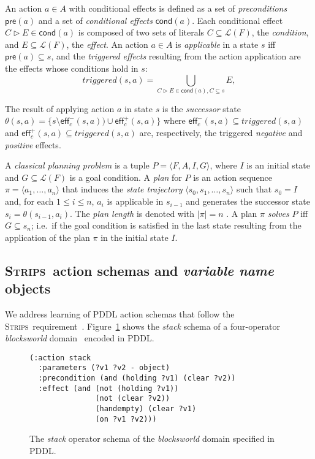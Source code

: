 \documentclass[letterpaper]{article} %
\newcommand{\tup}[1]{{\langle #1 \rangle}}
\newcommand{\pre}{\mathsf{pre}}     %
\newcommand{\eff}{\mathsf{eff}}     %
\newcommand{\cond}{\mathsf{cond}}   %
\newcommand{\strips}{\textsc{Strips}}     %
\begin{document}
An action $a\in A$ with conditional effects is defined as a set of {\em preconditions} $\pre(a)$ and a set of {\em conditional effects} $\cond(a)$. Each conditional effect $C\rhd E\in\cond(a)$ is composed of two sets of literals $C \subseteq \mathcal{L}(F)$, the {\em condition}, and $E \subseteq \mathcal{L}(F)$, the {\em effect}. An action $a\in A$ is {\em applicable} in a state $s$ iff $\pre(a)\subseteq s$, and the {\em triggered effects} resulting from the action application are the effects whose conditions hold in $s$:
\[
triggered(s,a)=\bigcup_{C\rhd E\in\cond(a),C\subseteq s} E,
\]

The result of applying action $a$ in state $s$ is the {\em successor} state $\theta(s,a)=\{s\setminus\eff_c^-(s,a))\cup\eff_c^+(s,a)\}$ where $\eff_c^-(s,a)\subseteq triggered(s,a)$ and $\eff_c^+(s,a)\subseteq triggered(s,a)$ are, respectively, the triggered {\em negative} and {\em positive} effects.


A {\em classical planning problem} is a tuple $P=\tup{F,A,I,G}$, where $I$ is an initial state and $G\subseteq\mathcal{L}(F)$ is a goal condition. A {\em plan} for $P$ is an action sequence $\pi=\tup{a_1, \ldots, a_n}$ that induces the {\em state trajectory} $\tup{s_0, s_1, \ldots, s_n}$ such that $s_0=I$ and, for each {\small $1\leq i\leq n$}, $a_i$ is applicable in $s_{i-1}$ and generates the successor state $s_i=\theta(s_{i-1},a_i)$. The {\em plan length} is denoted with $|\pi|=n$ . A plan $\pi$ {\em solves} $P$ iff $G\subseteq s_n$; i.e.~if the goal condition is satisfied in the last state resulting from the application of the plan $\pi$ in the initial state $I$.


\subsection{\strips\ action schemas and {\em variable name} objects}
We address learning of PDDL action schemas that follow the \strips\ requirement~\cite{mcdermott1998pddl,fox2003pddl2}. Figure~\ref{fig:stack} shows the {\em stack} schema of a four-operator {\em blocksworld} domain~\cite{slaney2001blocks} encoded in PDDL.

\begin{figure}
\begin{footnotesize}
\begin{verbatim}
(:action stack
  :parameters (?v1 ?v2 - object)
  :precondition (and (holding ?v1) (clear ?v2))
  :effect (and (not (holding ?v1))
               (not (clear ?v2))
               (handempty) (clear ?v1)
               (on ?v1 ?v2)))
\end{verbatim}
\end{footnotesize}
 \caption{\small The {\em stack} operator schema of the {\em blocksworld} domain specified in PDDL.}
\label{fig:stack}
\end{figure}
\end{document}
